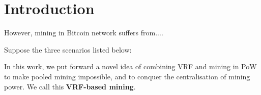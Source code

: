\section{Introduction}




However, mining in Bitcoin network suffers from....




Suppose the three scenarios listed below:






In this work, we put forward a novel idea of combining VRF and mining in PoW to make pooled mining impossible, and to conquer the centralisation of mining power.
We call this \textbf{VRF-based mining}.